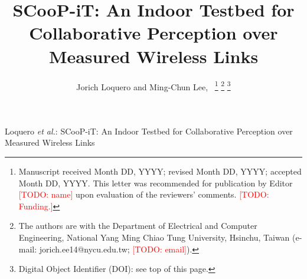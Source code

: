 \documentclass[journal]{IEEEtran}
\newcommand{\todo}[1]{\textcolor{red}{[TODO: #1]}}
\begin{document}
\title{SCooP-iT: An Indoor Testbed for Collaborative Perception over Measured Wireless Links}

\author{Jorich Loquero and Ming-Chun Lee,~%
\thanks{Manuscript received Month DD, YYYY; revised Month DD, YYYY; accepted
Month DD, YYYY. This letter was recommended for publication by Editor
\todo{name} upon evaluation of the reviewers' comments. \todo{Funding.}}%
\thanks{The authors are with the Department of Electrical and Computer
Engineering, National Yang Ming Chiao Tung University, Hsinchu, Taiwan
(e-mail: jorich.ee14@nycu.edu.tw; \todo{email}).}%
\thanks{Digital Object Identifier (DOI): see top of this page.}}

%
{Loquero \MakeLowercase{\textit{et al.}}: SCooP-iT: An Indoor Testbed for Collaborative Perception over Measured Wireless Links}

\maketitle
\end{document}
